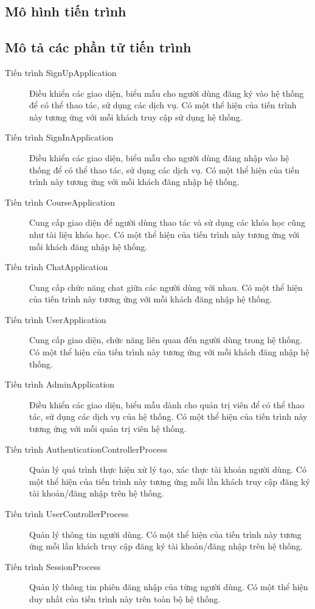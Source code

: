 \documentclass[./../main_file.tex]{subfiles}
\begin{document}
	\subsection{Mô hình tiến trình}
	\subsection{Mô tả các phần tử tiến trình}
	\begin{description}
		\item[Tiến trình SignUpApplication] Điều khiển các giao diện, biểu mẫu cho người dùng đăng ký vào hệ thống để có thể thao tác, sử dụng các dịch vụ.
		Có một thể hiện của tiến trình này tương ứng với mỗi khách truy cập sử dụng hệ thống.
		\item[Tiến trình SignInApplication] Điều khiển các giao diện, biểu mẫu cho người dùng đăng nhập vào hệ thống để có thể thao tác, sử dụng các dịch vụ.
		Có một thể hiện của tiến trình này tương ứng với mỗi khách đăng nhập hệ thống.
		\item[Tiến trình CourseApplication] Cung cấp giao diện để người dùng thao tác và sử dụng các khóa học cũng như tài liệu khóa học. Có một thể hiện của tiến trình này tương ứng với mỗi khách đăng nhập hệ thống.
		\item[Tiến trình ChatApplication] Cung cấp chức năng chat giữa các người dùng với nhau. Có một thể hiện của tiến trình này tương ứng với mỗi khách đăng nhập hệ thống.
		\item[Tiến trình UserApplication] Cung cấp giao diện, chức năng liên quan đến người dùng trong hệ thống. Có một thể hiện của tiến trình này tương ứng với mỗi khách đăng nhập hệ thống.
		\item[Tiến trình AdminApplication] Điều khiển các giao diện, biểu mẫu dành cho quản trị viên để có thể thao tác, sử dụng các dịch vụ của hệ thống.
		Có một thể hiện của tiến trình này tương ứng với mỗi quản trị viên hệ thống.
		\item[Tiến trình AuthenticationControllerProcess] Quản lý quá trình thực hiện xử lý tạo, xác thực tài khoản người dùng.
		Có một thể hiện của tiến trình này tương ứng mỗi lần khách truy cập đăng ký tài khoản/đăng nhập trên hệ thống.
		\item[Tiến trình UserControllerProcess] Quản lý thông tin người dùng. Có một thể hiện của tiến trình này tương ứng mỗi lần khách truy cập đăng ký tài khoản/đăng nhập trên hệ thống.
		\item[Tiến trình SessionProcess] Quản lý thông tin phiên đăng nhập của từng người dùng. Có một thể hiện duy nhất của tiến trình này trên toàn bộ hệ thống.

\end{description}
\end{document}
